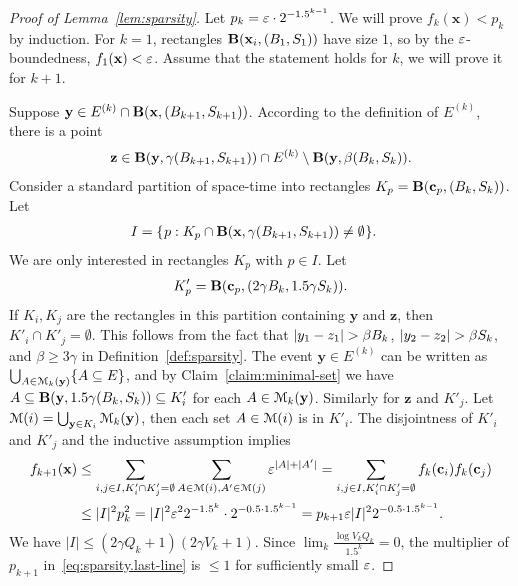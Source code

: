 \documentclass[11pt]{memoir}
\theoremstyle{definition} %
\renewcommand{\le}{\leq}
\renewcommand{\ge}{\geq}
\renewcommand{\vek}[1]{\mathbf{#1}}
\def\B{B}
\def\V{V}
\newcommand{\Q}{Q} %
\renewcommand{\S}{S} %
\newcommand{\x}{\vek{x}} %
\newcommand{\y}{\vek{y}} %
\begin{document}
\begin{proof}[Proof of Lemma~\ref{lem:sparsity}]
Let \( p_{k}= \varepsilon\cdot 2^{-1.5^{k-1}} \).
We will prove \(   f_{k}(\x) < p_{k} \) by induction.
For \( k=1 \), rectangles \( \bB(\x_{i},\pair{\B_{1}}{\S_{1}}) \) have size \( 1 \), so
by the \( \varepsilon \)-boundedness, \( f_{1}(\x)<\eps \).
 Assume that the statement holds for \( k \), we will prove it for \( k+1 \).

 Suppose \( \y \in E^{(k)}\cap \bB(\x,\pair{\B_{k+1}}{\S_{k+1}}) \).
According to the definition of \( E^{(k)} \),  there is a point
\begin{align}\label{eq:sparse-as}
 \vek{z} \in
 \bB(\y,\gamma\pair{\B_{k+1}}{\S_{k+1}})\cap E^{(k)}\setminus \bB(\y,\beta\pair{\B_{k}}{\S_{k}}).
 \end{align}
Consider a standard partition of space-time into rectangles \(  K_{p}=\bB(\vek{c}_{p},(\B_{k},\S_{k})) \).
Let 
\begin{align*}
       I&=\setOf{p}{K_{p}\cap \bB(\x,\gamma\pair{\B_{k+1}}{\S_{k+1}})\ne\emptyset}.
 \end{align*}
 We are only interested in rectangles \( K_{p} \) with \( p\in I \).
 Let
\begin{align*}
  K'_{p}=\bB(\vek{c}_{p},\pair{2\gamma\B_{k}}{1.5\gamma\S_{k}}) .
\end{align*}
If \( K_{i},K_{j} \) are the rectangles in this partition containing \( \y \) and \( \vek{z} \), then
\( K'_{i}\cap K'_{j}=\emptyset \).
This follows from the fact that \( \abs{y_{1} - z_{1}}>\beta\B_{k} \),
\( \abs{y_{2} - z_{2}}>\beta\S_{k} \), and \( \beta\ge 3\gamma \) 
in Definition~\ref{def:sparsity}.
The event \( \y\in E^{(k)} \) can be written as
\( \bigcup_{A\in\cM_{k}(\y)}\{A\subseteq E\} \), and
by Claim~\ref{claim:minimal-set} we have \( A\subseteq \bB(\y,1.5\gamma(B_{k},\S_{k}))\subseteq K'_{i} \)
for each \( A\in\cM_{k}(\y) \).
Similarly for \( \vek{z} \) and \( K'_{j} \).
Let \( \cM(i)=\bigcup_{\y\in K_{i}}\cM_{k}(\y) \), then each set \( A\in\mathcal{M}(i) \) is in \( K'_{i} \).
The disjointness of \( K'_{i} \) and \( K'_{j} \) and the inductive assumption implies
\begin{align}\nonumber
  f_{k+1}(\x) &\le \sum_{i,j\in I, K'_{i}\cap K'_{j}=\emptyset}\sum_{A\in\cM(i),A'\in\cM(j)}\eps^{|A|+|A'|}
   =\sum_{i,j\in I, K'_{i}\cap K'_{j}=\emptyset}f_{k}(\vek{c}_{i})f_{k}(\vek{c}_{j})
  \\\label{eq:sparsity.last-line}&\le |I|^{2}p_{k}^{2} = |I|^{2}\eps^{2} 2^{-1.5^{k}}\cdot 2^{-0.5\cdot 1.5^{k-1}}
       = p_{k+1}\eps |I|^{2}2^{-0.5\cdot 1.5^{k-1}}.
\end{align}
We have  \( |I|\le (2\gamma \Q_{k}+1)(2\gamma\V_{k}+1) \).
Since \( \lim_{k}\frac{\log\V_{k}\Q_{k}}{1.5^k}=0 \), 
the multiplier of \( p_{k+1} \) in~\eqref{eq:sparsity.last-line} is \( \le 1 \) for sufficiently small  \( \varepsilon \).
\end{proof}
\end{document}
